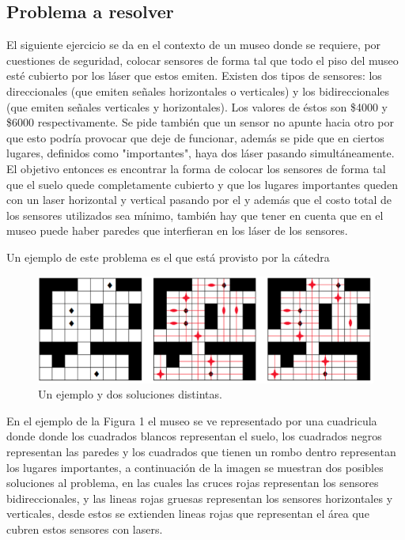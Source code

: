 \subsection{Problema a resolver}

El siguiente ejercicio se da en el contexto de un museo donde se requiere, por cuestiones de seguridad, colocar sensores de forma tal que todo el piso del museo esté cubierto por los láser que estos emiten. Existen dos tipos de sensores: los direccionales (que emiten señales horizontales o verticales) y los bidireccionales (que emiten señales verticales y horizontales). Los valores de éstos son \$4000 y \$6000 respectivamente. Se pide también que un sensor no apunte hacia otro por que esto podría provocar que deje de funcionar, además se pide que en ciertos lugares, definidos como "importantes", haya dos láser pasando simultáneamente. El objetivo entonces es encontrar la forma de colocar los sensores de forma tal que el suelo quede completamente cubierto y que los lugares importantes queden con un laser horizontal y vertical pasando por el y además que el costo total de los sensores utilizados sea mínimo, también hay que tener en cuenta que en el museo puede haber paredes que interfieran en los láser de los sensores.

Un ejemplo de este problema es el que está provisto por la cátedra

\begin{figure}[H]
	\begin{center}
		\includegraphics[width=320pt]{../imgs/ej3_ejemploCatedra.png}
	\end{center}
\caption{Un ejemplo y dos soluciones distintas.}
\end{figure}

En el ejemplo de la Figura 1 el museo se ve representado por una cuadricula donde donde los cuadrados blancos representan el suelo, los cuadrados negros representan las paredes y los cuadrados que tienen un rombo dentro representan los lugares importantes, a continuación de la imagen se muestran dos posibles soluciones al problema, en las cuales las cruces rojas representan los sensores bidireccionales, y las lineas rojas gruesas representan los sensores horizontales y verticales, desde estos se extienden lineas rojas que representan el área que cubren estos sensores con lasers.

